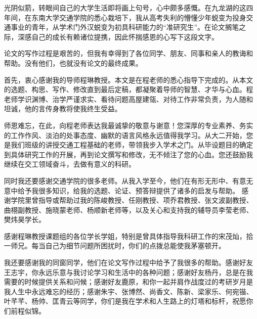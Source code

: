 \let\cleardoublepage\clearpage
\acknowledgement
光阴似箭，转眼间自己的大学生活即将画上句号，心中颇多感慨。在九龙湖的这四年间，在东南大学交通学院的悉心栽培下，我从高考失利的懵懂少年蜕变为投身交通事业的青年，从学术门外汉蜕变为初具科研能力的“准研究生”。在论文搁笔之际，深感自己的成长有赖诸位提携，因此怀揣感恩的心写下这段文字。

论文的写作过程是艰苦的，但我有幸得到了各位同学、朋友、同事和亲人的教诲和帮助。没有他们，也就没有论文的最终成果。

首先，衷心感谢我的导师程琳教授。本文是在程老师的悉心指导下完成的。从本文的选题、构思、写作、修改直到最后定稿，都凝聚着导师的智慧、才华与心血。程老师学识渊博、治学严谨求实、看待问题高屋建瓴、对待工作非常负责，为人随和坦诚，他的言传身教将使我终生受益。

师恩难忘，在此，向程老师表达我最诚挚的敬意与谢意！您深厚的专业素养、务实的工作作风、淡泊的处事态度、幽默的语言风格永远值得我学习。从大二开始，您是我们班级的讲授交通工程基础的老师，带领我步入学术之门。从毕设题目的确定到具体研究工作的开展，再到论文撰写和修改，无不倾注了您的心血。您还鼓励我继续在交工领域奋斗，去做有意义的科研。

同时我还要感谢交通学院的很多老师。从我入学至今，他们在有形无形中、有意无意中给予我很多知识，给我的选题、论证、预答辩提供了诸多的启发与帮助。
感谢学院里曾指导或帮助过我的陈峻教授、任刚教授、项乔君教授、张文波副教授、曲栩副教授、施晓蒙老师、杨顺新老师等，以及关心和支持我的辅导员李莹老师、樊炜昊学长。

感谢程琳教授课题组的各位学长学姐，特别是曾具体指导我科研工作的宋茂灿，拾一师兄。每当自己为细节问题所困扰时，你们的点拨总能使我茅塞顿开。

我还要感谢我的同窗同学，他们在论文写作过程中给予了我很多的帮助。感谢好友王志宇，你永远乐意与我讨论学习和生活中的各种问题；感谢好友杨丹，总是在我需要的时候提供关系和问候；感谢好友鹿原，和你一起并肩作战度过的考研岁月是我人生中永远难忘的经历；感谢朱宇、张博然、尚香文、陈新、梁家乐、何宛锴、叶芊芊、杨帅、匡青云等同学，你们是我在学术和人生路上的灯塔和标杆，祝愿你们前程似锦。